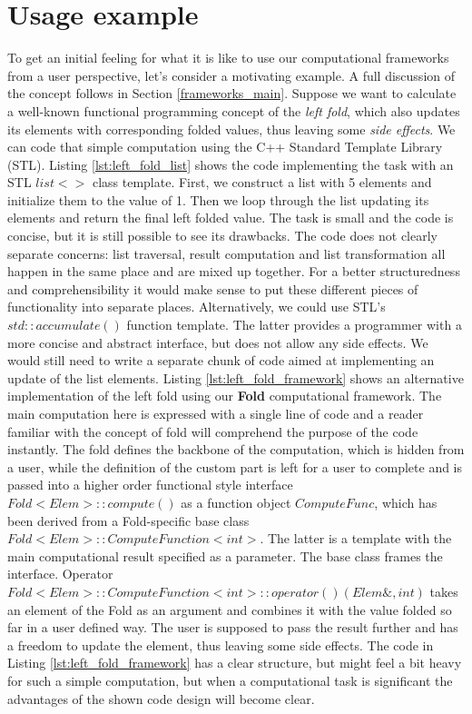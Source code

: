 \section{Usage example}
\label{frameworks_usage_example}
\quad To get an initial feeling for what it is like to use our computational frameworks from a user perspective, let's consider a motivating example. A full discussion of the concept follows in Section \ref{frameworks_main}. Suppose we want to calculate a well-known functional programming concept of the \textit{left fold}, which also updates its elements with corresponding folded values, thus leaving some \textit{side effects}.\newline\null
\quad We can code that simple computation using the C++ Standard Template Library (STL). Listing \ref{lst:left_fold_list} shows the code implementing the task with an STL $list<> $ class template. First, we construct a list with 5 elements and initialize them to the value of 1. Then we loop through the list updating its elements and return the final left folded value. The task is small and the code is concise, but it is still possible to see its drawbacks. The code does not clearly separate concerns: list traversal, result computation and list transformation all happen in the same place and are mixed up together. For a better structuredness and comprehensibility it would make sense to put these different pieces of functionality into separate places. Alternatively, we could use STL's $std::accumulate()$ function template. The latter provides a programmer with a more concise and abstract interface, but does not allow any side effects. We would still need to write a separate chunk of code aimed at implementing an update of the list elements.\newline\null 
\quad Listing \ref{lst:left_fold_framework} shows an alternative implementation of the left fold using our \textbf{Fold} computational framework. The main computation here is expressed with a single line of code and a reader familiar with the concept of fold will comprehend the purpose of the code instantly. The fold defines the backbone of the computation, which is hidden from a user, while the definition of the custom part is left for a user to complete and is passed into a higher order functional style interface $Fold<Elem>::compute()$ as a function object $ComputeFunc$, which has been derived from a Fold-specific base class $Fold<Elem>::ComputeFunction<int>$. The latter is a template with the main computational result specified as a parameter. The base class frames the interface. Operator $Fold<Elem>::ComputeFunction<int>::operator()(Elem\&,int)$ takes an element of the Fold as an argument and combines it with the value folded so far in a user defined way. The user is supposed to pass the result further and has a freedom to update the element, thus leaving some side effects. The code in Listing \ref{lst:left_fold_framework} has a clear structure, but might feel a bit heavy for such a simple computation, but when a computational task is significant the advantages of the shown code design will become clear.

